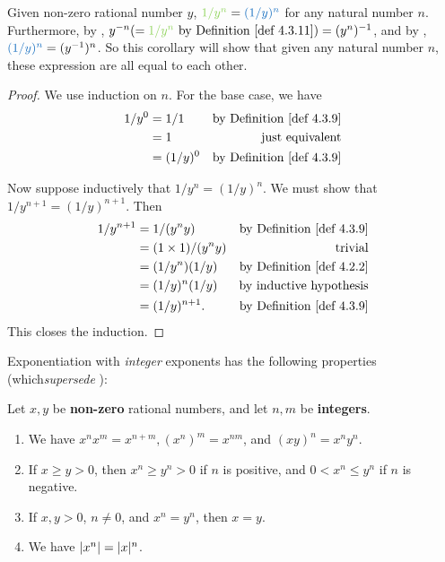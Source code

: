 \begin{additional corollary} \label{ac 4.3.4}
Given non-zero rational number \(y\), \(\GREEN{1/y^n} = \BLUE{(1/y)^n}\) for any natural number \(n\).
Furthermore, by , \(y^{-n} (= \GREEN{1/y^n} \text{ by \DEF{4.3.11}}) = (y^n)^{-1}\), and by , \(\BLUE{(1/y)^n} = (y^{-1})^n\). So this corollary will show that given any natural number \(n\), these expression are all equal to each other.
\end{additional corollary}
\begin{proof}
We use induction on \(n\).
For the base case, we have
\begin{align*}
    1/y^0 & = 1/1 & \text{by \DEF{4.3.9}} \\
          & = 1 & \text{just equivalent} \\
          & = (1/y)^0 & \text{by \DEF{4.3.9}}
\end{align*}

Now suppose inductively that \(1/y^n = (1/y)^n\). We must show that \(1/y^{n+1} = (1/y)^{n+1}\).
Then
\begin{align*}
    1/y^{n+1} & =  1 / (y^n y) & \text{by \DEF{4.3.9}} \\
              & =  (1 \X 1)/ (y^n y) & \text{trivial} \\
              & = (1/y^n)(1/y) & \text{by \DEF{4.2.2}} \\
              & = (1/y)^n (1/y) & \text{by inductive hypothesis} \\
              & = (1/y)^{n+1}. & \text{by \DEF{4.3.9}}
\end{align*}
This closes the induction.
\end{proof}

Exponentiation with \emph{integer} exponents has the following properties (which\emph{supersede} ):

\begin{proposition}  \label{prop 4.3.12}
Let \(x, y\) be \textbf{non-zero} rational numbers, and let \(n, m\) be \textbf{integers}.
\begin{enumerate}
    \item
        We have \(x^nx^m = x^{n + m}, (x^n)^m = x^{nm}\), and \((xy)^n = x^ny^n\).
    \item
        If \(x \ge y > 0\), then \(x^n \ge y^n > 0\) if \(n\) is positive, and \(0 < x^n \le y^n\) if \(n\) is negative.
    \item
        If \(x, y > 0\), \(n \neq 0\), and \(x^n = y^n\), then \(x = y\).
    \item
        We have \(\lvert x^n\rvert = \lvert x\rvert^n\).
\end{enumerate}
\end{proposition}

